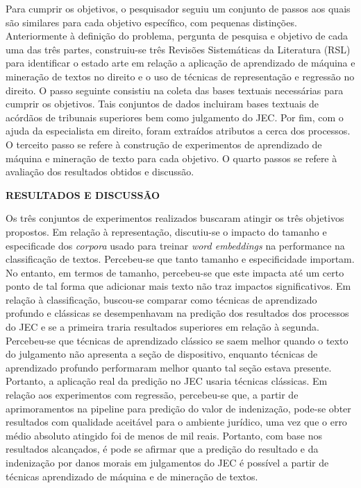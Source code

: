\begin{resumo}
Para cumprir os objetivos, o pesquisador seguiu um conjunto de passos aos quais são similares para cada objetivo específico, com pequenas distinções.
Anteriormente à definição do problema, pergunta de pesquisa e objetivo de cada uma das três partes, construiu-se três Revisões Sistemáticas da Literatura (RSL) para identificar o estado arte em relação a aplicação de aprendizado de máquina e mineração de textos no direito e o uso de técnicas de representação e regressão no direito.
O passo seguinte consistiu na coleta das bases textuais necessárias para cumprir os objetivos. Tais conjuntos de dados incluiram bases textuais de acórdãos de tribunais superiores bem como julgamento do JEC. Por fim, com o ajuda da especialista em direito, foram extraídos atributos a cerca dos processos.
O terceito passo se refere à construção de experimentos de aprendizado de máquina e mineração de texto para cada objetivo.
O quarto passos se refere à avaliação dos resultados obtidos e discussão.


\textbf{\textsf{RESULTADOS E DISCUSSÃO}}

Os três conjuntos de experimentos realizados buscaram atingir os três objetivos propostos. Em relação à representação, discutiu-se o impacto do tamanho e especificade dos \textit{corpora} usado para treinar \textit{word embeddings} na performance na classificação de textos. Percebeu-se que tanto tamanho e especificidade importam. No entanto, em termos de tamanho, percebeu-se que este impacta até um certo ponto de tal forma que adicionar mais texto não traz impactos significativos. Em relação à classificação, buscou-se comparar como técnicas de aprendizado profundo e clássicas se desempenhavam na predição dos resultados dos processos do JEC e se a primeira traria resultados superiores em relação à segunda. Percebeu-se que técnicas de aprendizado clássico se saem melhor quando o texto do julgamento não apresenta a seção de dispositivo, enquanto técnicas de aprendizado profundo performaram melhor quanto tal seção estava presente. Portanto, a aplicação real da predição no JEC usaria técnicas clássicas. Em relação aos experimentos com  regressão, percebeu-se que, a partir de aprimoramentos na pipeline para predição do valor de indenização, pode-se obter resultados com qualidade aceitável para o ambiente jurídico, uma vez que o erro médio absoluto atingido foi de menos de mil reais. Portanto, com base nos resultados alcançados, é pode se afirmar que a predição do resultado e da indenização por danos morais em julgamentos do JEC é possível a partir de técnicas aprendizado de máquina e de mineração de textos.


\end{resumo}
